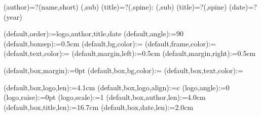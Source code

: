 
%


\makeatletter




\spine(author)=?{\thedocauthor(name,short)}
(\@LANG@COVER,sub){%
  \spine(title)=?{\thedoctitle(\@LANG@COVER,spine): \thedoctitle(\@LANG@COVER,sub)}
}{%
  \spine(title)=?{\thedoctitle(\@LANG@COVER,spine)}
}
\spine(date)=?{\thentdocdate(year)}


\spine(default,order):={logo,author,title,date}
\spine(default,angle):={90}
\spine(default,boxsep):={0.5cm}
\spine(default,bg,color):={}
\spine(default,frame,color):={}
\spine(default,text,color):={}
\spine(default,margin,left):={0.5cm}
\spine(default,margin,right):={0.5cm}

\spine(default,box,margin):={0pt}
\spine(default,box,bg,color):={}
\spine(default,box,text,color):={}

\spine(default,box,logo,len):={4.1cm}
\spine(default,box,logo,align):={c}
\spine(logo,angle):={0}
\spine(logo,raise):={0pt}
\spine(logo,scale):={1}
\spine(default,box,author,len):={4.0cm}
\spine(default,box,title,len):={16.7cm}
\spine(default,box,date,len):={2.0cm}



\newif\ifisdim
\newcommand{\@setifisdim}[1]{%
  \StrLeft{#1}{1}[\@dimleft]%
  \StrRight{#1}{1}[\@dimright]%
  \IfInteger{\@dimleft}{%
    \IfInteger{\@dimright}{%
      \isdimfalse%
    }{%
      \isdimtrue%
    }%
  }{%
    \isdimfalse%
  }%
}
\newcommand{\IfIsDim}[3]{%
  \@setifisdim{#1}%
  \ifisdim#2\else#3\fi%
}

